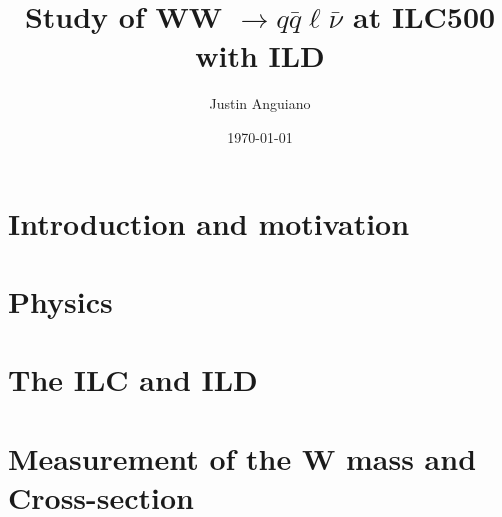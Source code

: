 \documentclass[%
 amsmath,amssymb,
 aps,
 prc
]{revtex4-1}
\begin{document}
\title{Study of WW $\rightarrow q\bar{q}\ell\bar{\nu}$ at ILC500 with ILD }
\author{Justin Anguiano}
\date{\today}


\begin{abstract}

\end{abstract}


\maketitle
\clearpage\mbox{}\clearpage

\section{Introduction and motivation}
\label{sec:Introduction}


\section{Physics}
\label{sec:physics}





\section{The ILC and ILD}
\label{sec:ILC_detector}



\section{Measurement of the W mass and Cross-section}
\label{Current_Work} 

\end{document}
